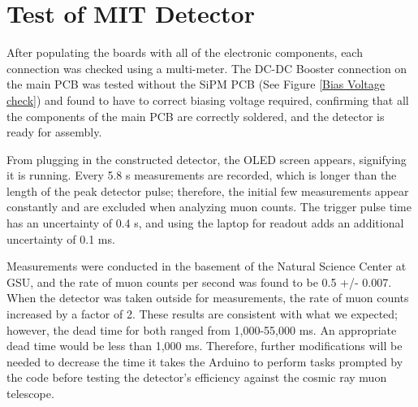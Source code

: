 \section{Test of MIT Detector}
After populating the boards with all of the electronic components, each connection was checked using a multi-meter. The DC-DC Booster connection on the main PCB was tested without the SiPM PCB (See Figure \ref{Bias Voltage check}) and found to have to correct biasing voltage required, confirming that all the components of the main PCB are correctly soldered, and the detector is ready for assembly.

    From plugging in the constructed detector, the OLED screen appears, signifying it is running.  Every 5.8 \textmu s measurements are recorded, which is longer than the length of the peak detector pulse; therefore, the initial few measurements appear constantly and are excluded when analyzing muon counts. The trigger pulse time has an uncertainty of 0.4 \textmu s, and using the laptop for readout adds an additional uncertainty of 0.1 ms. 

    Measurements were conducted in the basement of the Natural Science Center at GSU, and the rate of muon counts per second was found to be 0.5 +/- 0.007. When the detector was taken outside for measurements, the rate of muon counts increased by a factor of 2. These results are consistent with what we expected; however, the dead time for both ranged from 1,000-55,000 ms. An appropriate dead time would be less than 1,000 ms. Therefore, further modifications will be needed to decrease the time it takes the Arduino to perform tasks prompted by the code before testing the detector's efficiency against the cosmic ray muon telescope. 

